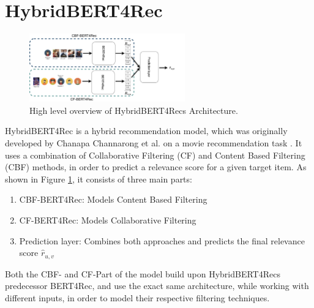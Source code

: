 \documentclass{Academic}
\begin{document}
    \section{HybridBERT4Rec}
        \begin{figure}[ht!]
            \centering
            \includegraphics[width=0.6\textwidth]{images/hybridBERT4Rec_high_level.pdf}
            \caption{High level overview of HybridBERT4Recs Architecture. \cite{channarongHybridBERT4RecHybridContentBased2022}}
            \label{fig:highlevel}
        \end{figure}
        HybridBERT4Rec is a hybrid recommendation model, which was originally developed by Chanapa Channarong et al. \cite{channarongHybridBERT4RecHybridContentBased2022} on a movie recommendation task \cite{channarongHybridBERT4RecHybridContentBased2022}. It uses a combination of Collaborative Filtering (CF) and Content Based Filtering (CBF) methods, in order to predict a relevance score for a given target item.
        As shown in Figure \ref{fig:highlevel}, it consists of three main parts:
        \begin{enumerate}
            \item CBF-BERT4Rec: Models Content Based Filtering
            \item CF-BERT4Rec: Models Collaborative Filtering
            \item Prediction layer: Combines both approaches and predicts the final relevance score $\hat{r}_{u,v}$
        \end{enumerate}
        Both the CBF- and CF-Part of the model build upon HybridBERT4Recs predecessor BERT4Rec, and use the exact same architecture, while working with different inputs, in order to model their respective filtering techniques.
\end{document}
